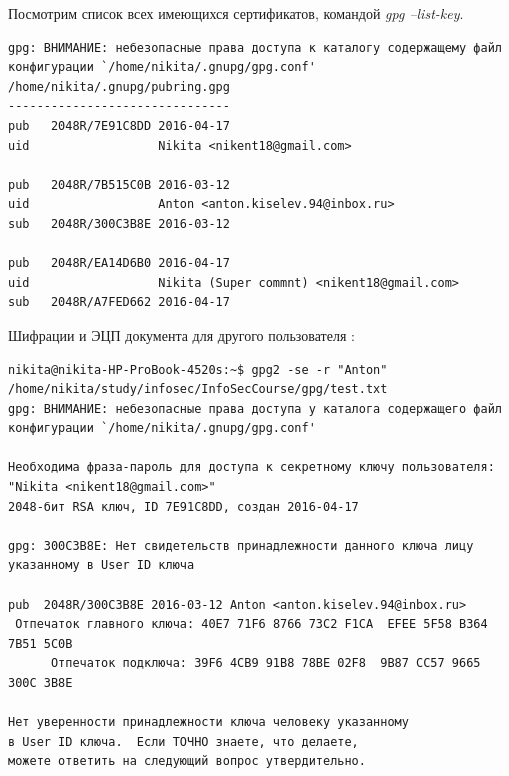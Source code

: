 \documentclass[10pt,a4paper]{report}
\begin{document}
Посмотрим список всех имеющихся сертификатов, командой \textit{gpg --list-key}.
\begin{verbatim}
gpg: ВНИМАНИЕ: небезопасные права доступа к каталогу содержащему файл конфигурации `/home/nikita/.gnupg/gpg.conf'
/home/nikita/.gnupg/pubring.gpg
-------------------------------
pub   2048R/7E91C8DD 2016-04-17
uid                  Nikita <nikent18@gmail.com>

pub   2048R/7B515C0B 2016-03-12
uid                  Anton <anton.kiselev.94@inbox.ru>
sub   2048R/300C3B8E 2016-03-12

pub   2048R/EA14D6B0 2016-04-17
uid                  Nikita (Super commnt) <nikent18@gmail.com>
sub   2048R/A7FED662 2016-04-17
\end{verbatim}


Шифрации и ЭЦП документа для другого пользователя :
\begin{verbatim}
nikita@nikita-HP-ProBook-4520s:~$ gpg2 -se -r "Anton" /home/nikita/study/infosec/InfoSecCourse/gpg/test.txt
gpg: ВНИМАНИЕ: небезопасные права доступа у каталога содержащего файл конфигурации `/home/nikita/.gnupg/gpg.conf'

Необходима фраза-пароль для доступа к секретному ключу пользователя: "Nikita <nikent18@gmail.com>"
2048-бит RSA ключ, ID 7E91C8DD, создан 2016-04-17

gpg: 300C3B8E: Нет свидетельств принадлежности данного ключа лицу указанному в User ID ключа

pub  2048R/300C3B8E 2016-03-12 Anton <anton.kiselev.94@inbox.ru>
 Отпечаток главного ключа: 40E7 71F6 8766 73C2 F1CA  EFEE 5F58 B364 7B51 5C0B
      Отпечаток подключа: 39F6 4CB9 91B8 78BE 02F8  9B87 CC57 9665 300C 3B8E

Нет уверенности принадлежности ключа человеку указанному
в User ID ключа.  Если ТОЧНО знаете, что делаете,
можете ответить на следующий вопрос утвердительно.
\end{verbatim}
\end{document}
